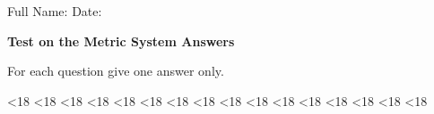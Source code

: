 \documentclass{./units4school}
\begin{document}
Full Name: %
\raisebox{-2pt}{\rule[-.4ex]{5cm}{.4pt}}\hfill%
Date: %
\raisebox{-2pt}{\rule[-.4ex]{3cm}{.4pt}}
\hspace*{.5cm}%


\vspace{6mm}
\textbf{\large Test on the Metric System \ifprintanswers \hfill \textcolor{AccentColor}{Answers}
\fi
}%
\vspace{3mm}

For each question give one answer only.








\ifnum\theexerciseID<18 {} \fi
\ifnum\theexerciseID<18 {} \fi
\ifnum\theexerciseID<18 {} \fi
\ifnum\theexerciseID<18 {} \fi
\ifnum\theexerciseID<18 {} \fi
\ifnum\theexerciseID<18 {} \fi
\ifnum\theexerciseID<18 {} \fi
\ifnum\theexerciseID<18 {} \fi
\ifnum\theexerciseID<18 {} \fi
\ifnum\theexerciseID<18 {} \fi
\ifnum\theexerciseID<18 {} \fi
\ifnum\theexerciseID<18 {} \fi
\ifnum\theexerciseID<18 {} \fi
\ifnum\theexerciseID<18 {} \fi
\ifnum\theexerciseID<18 {} \fi
\ifnum\theexerciseID<18 {} \fi
\end{document}
